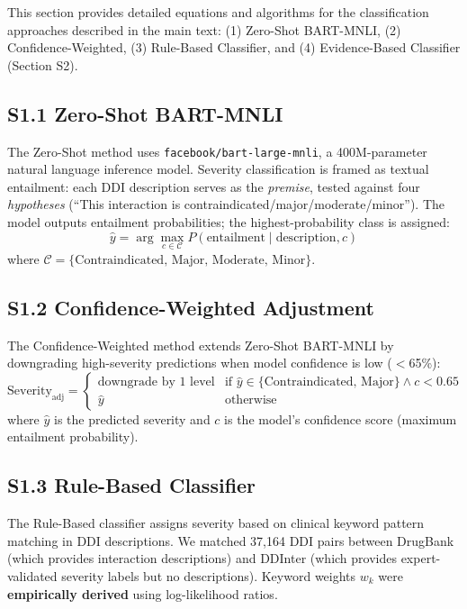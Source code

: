 \documentclass[11pt,a4paper]{article}
\begin{document}
This section provides detailed equations and algorithms for the classification approaches described in the main text: (1) Zero-Shot BART-MNLI, (2) Confidence-Weighted, (3) Rule-Based Classifier, and (4) Evidence-Based Classifier (Section S2).

\subsection{S1.1 Zero-Shot BART-MNLI}

The Zero-Shot method uses \texttt{facebook/bart-large-mnli}, a 400M-parameter natural language inference model. Severity classification is framed as textual entailment: each DDI description serves as the \textit{premise}, tested against four \textit{hypotheses} (``This interaction is contraindicated/major/moderate/minor''). The model outputs entailment probabilities; the highest-probability class is assigned:
\begin{equation}
\hat{y} = \arg\max_{c \in \mathcal{C}} P(\text{entailment} \mid \text{description}, c)
\end{equation}
where $\mathcal{C} = \{\text{Contraindicated, Major, Moderate, Minor}\}$.

\subsection{S1.2 Confidence-Weighted Adjustment}

The Confidence-Weighted method extends Zero-Shot BART-MNLI by downgrading high-severity predictions when model confidence is low ($<$65\%):
\begin{equation}
\text{Severity}_{\text{adj}} = 
\begin{cases}
\text{downgrade by 1 level} & \text{if } \hat{y} \in \{\text{Contraindicated, Major}\} \land c < 0.65 \\
\hat{y} & \text{otherwise}
\end{cases}
\end{equation}
where $\hat{y}$ is the predicted severity and $c$ is the model's confidence score (maximum entailment probability).

\subsection{S1.3 Rule-Based Classifier}

The Rule-Based classifier assigns severity based on clinical keyword pattern matching in DDI descriptions. We matched 37,164 DDI pairs between DrugBank (which provides interaction descriptions) and DDInter (which provides expert-validated severity labels but no descriptions). Keyword weights $w_k$ were \textbf{empirically derived} using log-likelihood ratios.
\end{document}
